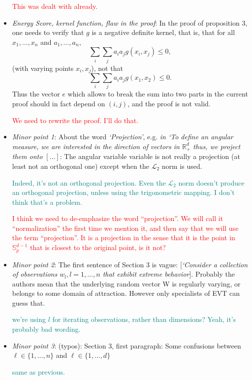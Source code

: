 \documentclass[10pt]{article}
\newcommand{\comment}[1]{\textcolor{teal}{#1}}
\newcommand{\bruno}[1]{\textcolor{red}{#1}}
\begin{document}
\begin{itemize}
    \bruno{This was dealt with already.}

    \item \emph{Energy Score, kernel function, flaw in the proof}: In the proof of proposition 3, 
    one needs to verify that $g$ is a negative definite kernel, that is, that for all $x_1,\ldots,x_n$
    and $a_1,\ldots,a_n$, \[ \sum_i\sum_ja_ia_jg(x_i,x_j)\leq 0,\]
    (with varying points $x_i,x_j$), not that \[\sum_i\sum_ja_ia_jg(x_1,x_2)\leq 0.\]  Thus the vector $e$
    which allows to break the sum into two parts in the current proof should in fact depend on $(i,j)$, 
    and the proof is not valid.

    \bruno{We need to rewrite the proof. I'll do that.}

    \item \emph{Minor point 1}: About the word \emph{‘Projection’}, e.g. \emph{in 
    ‘To define an angular measure, we are interested in the direction of vectors in $\mathbb{R}_+^d$
    thus, we project them onto $[\ldots]$}: The angular variable variable is not really a projection 
    (at least not an orthogonal one) except when the $\mathcal{L}_2$ norm is used.

    \comment{Indeed, it's not an orthogonal projection.  Even the $\mathcal{L}_2$ norm doesn't 
    produce an orthogonal projection, unless using the trigonometric mapping.  I don't think that's
    a problem.}

    \bruno{I think we need to de-emphasize the word ``projection''. We will call it ``normalization''
    the first time we mention it, and then say that we will use the term ``projection''. It is a
    projection in the sense that it is the point in $\mathbb{S}_p^{d-1}$ that is closest to the original
    point, is it not?}

    \item \emph{Minor point 2}: The first sentence of Section 3 is vague: [\emph{‘Consider a 
    collection of observations $w_l, l = 1,\ldots,n$ that exhibit extreme behavior}].  Probably the
    authors mean that the underlying random vector W is regularly varying, or belongs to some domain 
    of attraction. However only specialists of EVT can guess that.

    \comment{we're using $l$ for iterating observations, rather than dimensions?  Yeah, it's probably
    bad wording.}

    \item \emph{Minor point 3}: (typos): Section 3, first paragraph: Some confusions between 
        $\ell \in \lbrace 1,\ldots, n\rbrace$ and $\ell \in \lbrace 1,\ldots,d\rbrace$

    \comment{same as previous.}
\end{itemize}


\end{document}
